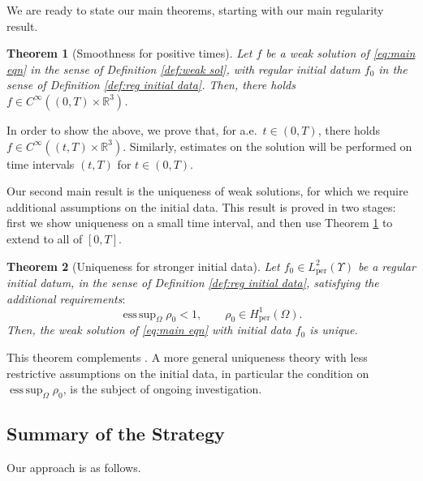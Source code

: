 \documentclass[11pt,a4paper,reqno]{amsart}
\newtheorem{thm}{Theorem}
\theoremstyle{remark}
\theoremstyle{definition}
\numberwithin{equation}{section}
\newcommand{\per}{\mathrm{per}}
\DeclareMathOperator{\esssup}{ess \, sup}
\begin{document}
We are ready to state our main theorems, starting with our main regularity result. 

    \begin{thm}[Smoothness for positive times]\label{thm:smooth}
        Let $f$ be a weak solution of \eqref{eq:main eqn} in the sense of Definition \ref{def:weak sol}, with regular initial datum $f_0$ in the sense of Definition \ref{def:reg initial data}. Then, there holds $f \in C^\infty((0,T)\times\mathbb{R}^3)$. 
    \end{thm}

In order to show the above, we prove that, for a.e.~$t \in (0,T)$, there holds $f \in C^\infty((t,T)\times\mathbb{R}^3)$. Similarly, estimates on the solution will be performed on time intervals $(t,T)$ for $t \in (0,T)$.




Our second main result is the uniqueness of weak solutions, for which we require additional assumptions on the initial data. This result is proved in two stages: first we show uniqueness on a small time interval, and then use Theorem \ref{thm:smooth} to extend to all of $[0,T]$. 

    
\begin{thm}[Uniqueness for stronger initial data]\label{thm:uniqueness}
    Let $f_0 \in {L^2_\per(\Upsilon)}$ be a regular initial datum, in the sense of Definition \ref{def:reg initial data}, satisfying the additional requirements$:$ 
    \begin{equation}\label{eq:assumptions uniqueness}
        \esssup_\Omega \rho_0 < 1, \qquad \rho_0 \in H^1_\per(\Omega). 
    \end{equation}
    Then, the weak solution of \eqref{eq:main eqn} with initial data $f_0$ is unique. 
\end{thm}

This theorem complements \cite[Theorems 2 and 4]{Martin}. A more general uniqueness theory with less restrictive assumptions on the initial data, in particular the condition on $\esssup_\Omega \rho_0$, is the subject of ongoing investigation.










\subsection{Summary of the Strategy}

    Our approach is as follows. 
\end{document}

